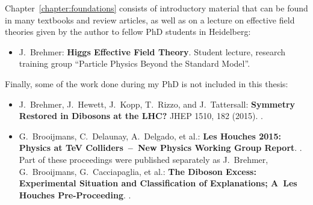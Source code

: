 Chapter~\ref{chapter:foundations} consists of introductory material
that can be found in many textbooks and review articles, as well as on
a lecture on effective field theories given by the author to fellow
PhD students in Heidelberg:
%
\begin{itemize}
  \item[\cite{Brehmer:EFTlecture}]  J.~Brehmer:\newline
	\textbf{Higgs Effective Field Theory}.\newline
        Student lecture, research training group ``Particle Physics Beyond the Standard Model''.
\end{itemize}

Finally, some of the work done during my PhD is not included in this thesis:
%
\begin{itemize}
  \item[\cite{Brehmer:2015cia}] J.~Brehmer, J.~Hewett, J.~Kopp, T.~Rizzo, and J.~Tattersall:\newline
	\textbf{Symmetry Restored in Dibosons at the LHC?} \newline
	JHEP 1510, 182 (2015). .
  \item[\cite{Brehmer:2015dan,Brooijmans:2016vro}] G.~Brooijmans, C.~Delaunay, A.~Delgado, et al.:\newline
         \textbf{Les Houches 2015: Physics at TeV Colliders~--~New Physics Working Group Report}.\newline
        .\newline
         Part of these proceedings were published separately as\newline
         J.~Brehmer, G.~Brooijmans,  G.~Cacciapaglia, et al.:\newline
	\textbf{The Diboson Excess: Experimental Situation and Classification of Explanations; A~Les Houches Pre-Proceeding}.\newline
	.
\end{itemize}
